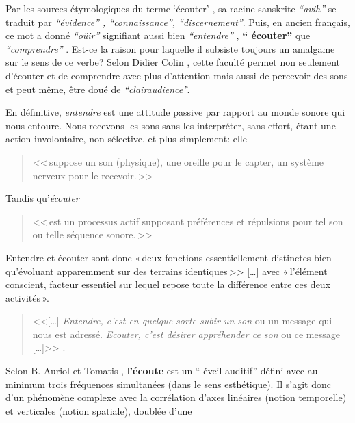 Par les sources étymologiques du
terme `écouter' ,
 sa racine sanskrite \emph{ ``avih'' } se traduit par
 \emph{``évidence'' , ``connaissance'', ``discernement''}. Puis, en ancien
 français, ce mot a donné \textit{``oüir''} signifiant aussi bien \textit{``entendre''} ,
\textbf{`` écouter'' } que \textit{``comprendre''} \autocite {etymologieWeb}.
 Est-ce la raison
pour laquelle il subsiste toujours un amalgame
sur le sens de ce verbe?
Selon Didier
Colin \autocite {colin2015}, cette faculté
permet non seulement d'écouter et de comprendre avec plus d'attention
mais aussi de percevoir des sons et peut même, être doué de
\textit{``clairaudience'}'.

En définitive, \emph{entendre} est une attitude passive par rapport au monde sonore
qui nous entoure. Nous recevons les sons sans les interpréter, sans
effort, étant une action involontaire, non
sélective, et plus simplement:  elle
\begin{quote}
	<<\,suppose un son (physique), une oreille
	pour le capter, un système nerveux pour le recevoir.\,>>\autocite[p. 2, ch . 1]{auriol:cle}
 \end{quote}
 Tandis qu'\textit{écouter}
\begin{quote}
	<<\,est un
	processus actif supposant préférences et répulsions pour tel son ou
	telle séquence sonore.\,>>\autocite[p. 2, ch. 1]{auriol:cle}

\end{quote}
Entendre et écouter sont donc  «\,deux
fonctions essentiellement distinctes bien qu'évoluant apparemment sur
des terrains iden\-ti\-ques\,>>
[\dots] avec «\,l'é\-lé\-ment cons\-cient, facteur essentiel sur lequel repose toute la
différence entre ces deux activités\,». \autocite[]{tomatis_oreille_1991}
\begin{quote}

	<<[\ldots] \emph{Entendre, c'est en quelque sorte subir
		un son} ou un message qui nous est adressé. \emph{Ecouter, c'est désirer appréhender ce son} ou ce message [\ldots]>>
	\autocite{tomatis:education}.
\end{quote}
Selon B. Auriol \autocite[18] {auriol:cle} et Tomatis \autocite[52]
{tomatis:loreille}, l\textbf{'écoute} est un `` éveil auditif''  défini avec au
minimum trois
fréquences simultanées (dans le sens esthétique). Il s'agit donc d'un phénomène
complexe avec la corrélation d'axes
linéaires (notion temporelle) et verticales (notion spatiale), doublée d'une
